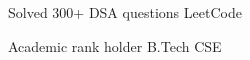 \begin{cvhonors}

  \cvhonor
    {Solved 300+ DSA questions} %
    {LeetCode} %
    {} %
    {} %

  \cvhonor
    {Academic rank holder} %
    {B.Tech CSE} %
    {} %
    {} %

\end{cvhonors}
